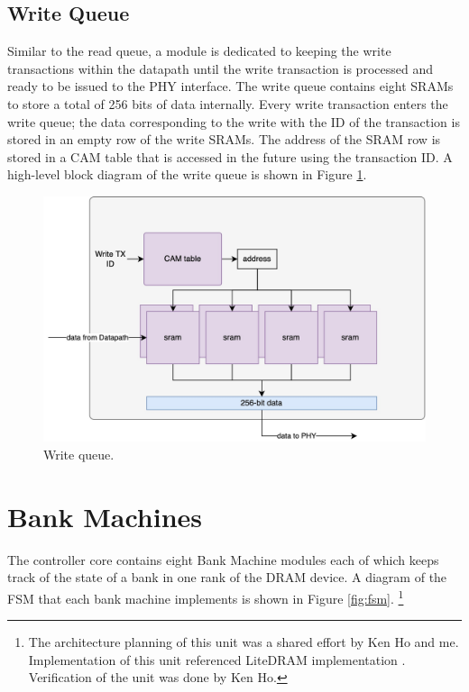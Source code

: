 \subsection{Write Queue}
Similar to the read queue, a module is dedicated to keeping the write transactions within the datapath until the write transaction is processed and ready to be issued to the PHY interface. 
The write queue contains eight SRAMs to store a total of 256 bits of data internally. Every write transaction enters the write queue; the data corresponding to the write with the ID of the transaction is stored in an empty row of the write SRAMs. The address of the SRAM row is stored in a CAM table that is accessed in the future using the transaction ID. A high-level block diagram of the write queue is shown in Figure \ref{fig:wrQ}.
\begin{figure}
    \centering
    \includegraphics[scale=0.2]{images/wrQ.jpg}
    \caption{Write queue.}
    \label{fig:wrQ}
\end{figure}
\section{Bank Machines}
The controller core contains eight Bank Machine modules each of which keeps track of the state of a bank in one rank of the DRAM device. A diagram of the FSM that each bank machine implements is shown in Figure \ref{fig:fsm}. \footnote{The architecture planning of this unit was a shared effort by Ken Ho and me. Implementation of this unit referenced LiteDRAM implementation \cite{enjoydigital}. Verification of the unit was done by Ken Ho.
}

